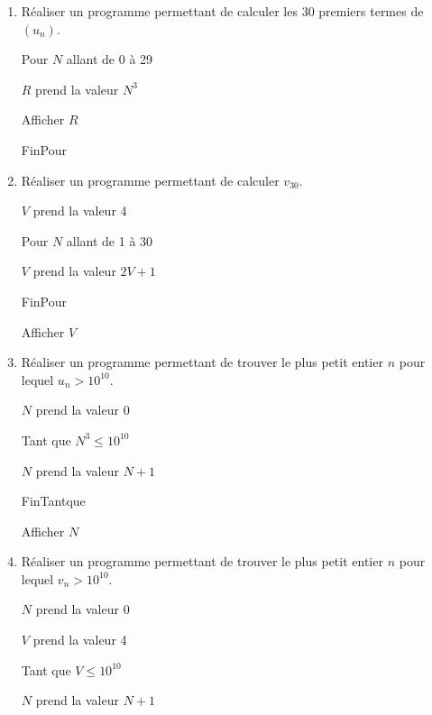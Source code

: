 \documentclass[a4paper,11pt]{article}
\theoremstyle{break}
\begin{document}
  \begin{enumerate}
  \item
  Réaliser un programme permettant de calculer les 30 premiers termes de $(u_n)$.
  
  \vspace{0.5cm}
  
  Pour $N$ allant de 0 à 29
  
  $R$ prend la valeur $N^3$
  
  Afficher $R$
  
  FinPour
  \vspace{0.5cm}
  
    \item
  Réaliser un programme permettant de calculer $v_{30}$. 
  
  \vspace{0.5cm}
  
  $V$ prend la valeur 4 
  
  Pour $N$ allant de 1 à 30
  
  $V$ prend la valeur $2V+1$
  
  FinPour
  
  Afficher $V$
  
  \vspace{0.5cm}
  
  \item 
  Réaliser un programme permettant de trouver le plus petit entier $n$ pour lequel $u_n>10^{10}$.
  
  
  \vspace{0.5cm}
  
  $N$ prend la valeur 0
  
  Tant que $N^3 \leq 10^{10}$
  
  $N$ prend la valeur $N+1$
  
  FinTantque
  
  Afficher $N$
  
  \vspace{0.5cm}
  
   \item 
  Réaliser un programme permettant de trouver le plus petit entier $n$ pour lequel $v_n>10^{10}$.
  
  \vspace{0.5cm}
  
  $N$ prend la valeur 0
  
  $V$ prend la valeur 4
  
  Tant que $V \leq 10^{10}$
  
  $N$ prend la valeur $N+1$
  

\end{enumerate}
\end{document}
